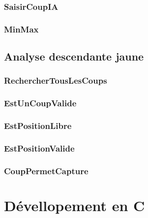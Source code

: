     \subsubsection{SaisirCoupIA}
      
    \subsubsection{MinMax}
      


  \subsection{Analyse descendante jaune}
    \subsubsection{RechercherTousLesCoups}
      
    \subsubsection{EstUnCoupValide}
      
    \subsubsection{EstPositionLibre}
      
    \subsubsection{EstPositionValide}
      
    \subsubsection{CoupPermetCapture}
      

  \newpage
  \section{Dévellopement en C}
    

